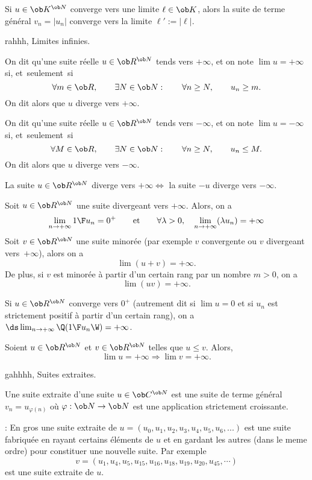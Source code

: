 \Propriete []  Si $u\in\ob K^{\ob N}$ converge vers une limite $\ell\in\ob K$, alors la suite de terme général $v_n=|u_n|$ converge vers la limite $\ell':=|\ell|$. 
\bigskip

\Subsection rahhh, Limites infinies. 

\Definition []  On dit qu'une suite réelle $u\in\ob R^{\ob N}$ tends vers $+\infty$, et on note $\lim u=+\infty$ si, et~seulement~si
$$
\forall m\in\ob R, \qquad \exists N\in\ob N:\qquad\forall n\ge N, \qquad u_n\ge m.
$$
On dit alors que $u$ diverge vers $+\infty$. 
\bigskip

\Definition []  On dit qu'une suite réelle $u\in\ob R^{\ob N}$ tends vers $-\infty$, et on note $\lim u=-\infty$ si, et~seulement~si
$$
\forall M\in\ob R, \qquad \exists N\in\ob N:\qquad\forall n\ge N, \qquad u_n\le M.
$$
On dit alors que $u$ diverge vers $-\infty$. 
\bigskip


\Propriete []  La suite $u\in\ob R^{\ob N}$ diverge vers $+\infty\Longleftrightarrow$ la suite $-u$ diverge vers $-\infty$. 
\bigskip

\Propriete []  Soit $u\in\ob R^{\ob N}$ une suite divergeant vers $+\infty$. Alors, on a 
$$
\lim_{n\to+\infty}{1\F u_n}=0^+\qquad\mbox{et}\qquad\forall \lambda> 0, \quad\lim_{n\to+\infty}(\lambda u_n)=+\infty
$$
Soit $v\in\ob R^{\ob N}$ une suite minorée (par exemple $v$ convergente ou $v$ divergeant vers~$+\infty$), alors on a 
$$
\lim(u+v)=+\infty.
$$ 
De plus, si $v$ est minorée à partir d'un certain rang par un nombre $m>0$, on a 
$$
\lim(uv)=+\infty.
$$

\Propriete []  Si $u\in\ob R^{\ob N}$ converge vers $0^+$ (autrement dit si $\lim u=0$ et si $u_n$ est strictement positif à partir d'un certain rang), on a $\ds\lim_{n\to+\infty}\Q({1\F u_n}\W)=+\infty$. 
\bigskip


\Propriete []  Soient $u\in\ob R^{\ob N}$ et $v\in\ob R^{\ob N}$ telles que $u\le v$. Alors, 
$$
\lim u=+\infty\Longrightarrow\lim v=+\infty.
$$

\Subsection gahhhh, Suites extraites. 


\Definition []  Une suite extraite d'une suite $u\in\ob C^{\ob N}$ est une suite de terme général $v_n=u_{\varphi(n)}$ où $\varphi:\ob N\to\ob N$ est une application strictement croissante. 
\bigskip

\Remarque : En gros une suite extraite de $u=(u_0,u_1,u_2,u_3,u_4,u_5,u_6,...)$ est une suite fabriquée en rayant certains éléments 
de $u$ et en gardant les autres (dans le meme ordre) pour constituer une nouvelle suite. Par exemple
$$
v=(u_1, u_4, u_5, u_{15}, u_{16}, u_{18}, u_{19}, u_{20}, u_{45}, \cdots)
$$
est une suite extraite de $u$. 
\bigskip

